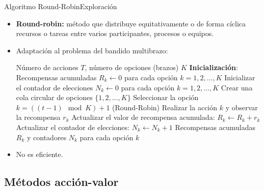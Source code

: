 \documentclass[10pt, envcountsect, handout, aspectratio=1610, hyperref={hypertexnames=true}]{beamer}
\begin{document}
\begin{frame}{Algoritmo Round-Robin}{Exploración}

\begin{itemize}
\item \textbf{Round-robin:} método que distribuye equitativamente o de forma cíclica recursos o tareas entre varios participantes, procesos o equipos.

\item Adaptación al problema del bandido multibrazo:
\begin{minipage}{.8\textwidth}
\begin{algoritmo}[H]	
\caption{\scriptsize{Algoritmo Round-Robin para el Problema del Bandido Multibrazo}}
\label{alg:Round-Robin}
	
\begin{algorithmic}[1]
\REQUIRE Número de acciones $T$, número de opciones (brazos) $K$
\STATE \textbf{Inicialización}: Recompensas acumuladas $R_k \gets 0$ para cada opción $k = 1, 2, \dots, K$
\STATE Inicializar el contador de elecciones $N_k \gets 0$ para cada opción $k = 1, 2, \dots, K$
\STATE Crear una cola circular de opciones $\{1, 2, \dots, K\}$
    \STATE Seleccionar la opción $k = ((t-1) \mod K) + 1$ (Round-Robin)
    \STATE Realizar la acción $k$ y observar la recompensa $r_k$
    \STATE Actualizar el valor de recompensa acumulada: $R_k \gets R_k + r_k$
    \STATE Actualizar el contador de elecciones: $N_k \gets N_k + 1$
\ENDFOR
\RETURN  Recompensas acumuladas $R_k$ y contadores $N_k$ para cada opción $k$
\end{algorithmic}

\end{algoritmo}
\end{minipage}

\item No es eficiente.
\end{itemize}

\end{frame}


\subsection{Métodos acción-valor}

\end{document}

